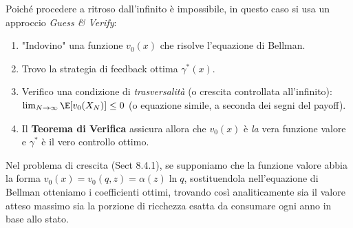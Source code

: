 Poiché procedere a ritroso dall'infinito è impossibile, in questo caso si usa un approccio \emph{Guess \& Verify}:
\begin{enumerate}
    \item "Indovino" una funzione $v_0(x)$ che risolve l'equazione di Bellman.
    \item Trovo la strategia di feedback ottima $\gamma^*(x)$.
    \item Verifico una condizione di \emph{trasversalità} (o crescita controllata all'infinito): $\lim_{N \to \infty} \E[v_0(X_N)] \le 0$ (o equazione simile, a seconda dei segni del payoff).
    \item Il \textbf{Teorema di Verifica} assicura allora che $v_0(x)$ è \emph{la} vera funzione valore e $\gamma^*$ è il vero controllo ottimo.
\end{enumerate}

\begin{esempio}
Nel problema di crescita (Sect 8.4.1), se supponiamo che la funzione valore abbia la forma $v_0(x) = v_0(q, z) = \alpha(z) \ln q$, sostituendola nell'equazione di Bellman otteniamo i coefficienti ottimi, trovando così analiticamente sia il valore atteso massimo sia la porzione di ricchezza esatta da consumare ogni anno in base allo stato.
\end{esempio}
